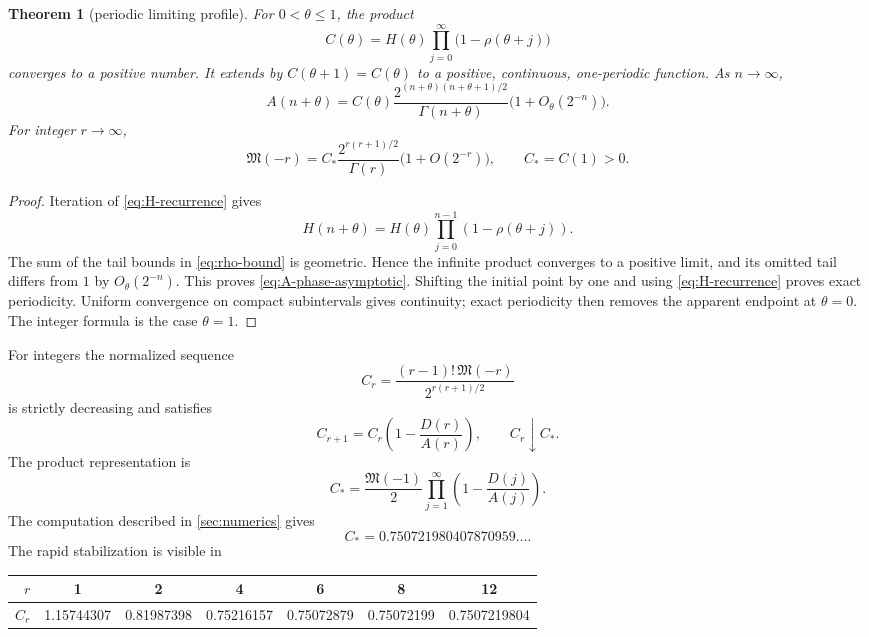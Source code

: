\documentclass[11pt,oneside]{article}
\newtheorem{theorem}{Theorem}[section]
\theoremstyle{definition}
\newcommand{\M}{\mathfrak M}
\begin{document}
\begin{theorem}[periodic limiting profile]\label{thm:phase-limit}
For \(0<\theta\le1\), the product
\begin{equation}\label{eq:Ctheta-product}
 C(\theta)=H(\theta)
 \prod_{j=0}^{\infty}\bigl(1-\rho(\theta+j)\bigr)
\end{equation}
converges to a positive number.  It extends by \(C(\theta+1)=C(\theta)\) to a
positive, continuous, one-periodic function.  As \(n\to\infty\),
\begin{equation}\label{eq:A-phase-asymptotic}
 A(n+\theta)=C(\theta)
 \frac{2^{(n+\theta)(n+\theta+1)/2}}{\Gamma(n+\theta)}
 \bigl(1+O_\theta(2^{-n})\bigr).
\end{equation}
For integer \(r\to\infty\),
\begin{equation}\label{eq:integer-negative-asymptotic}
 \boxed{\displaystyle
 \M(-r)=C_*\frac{2^{r(r+1)/2}}{\Gamma(r)}
 \bigl(1+O(2^{-r})\bigr),}
 \qquad C_*=C(1)>0.
\end{equation}
\end{theorem}

\begin{proof}
Iteration of \cref{eq:H-recurrence} gives
\[
 H(n+\theta)=H(\theta)
 \prod_{j=0}^{n-1}(1-\rho(\theta+j)).
\]
The sum of the tail bounds in \cref{eq:rho-bound} is geometric.  Hence the infinite
product converges to a positive limit, and its omitted tail differs from \(1\) by
\(O_\theta(2^{-n})\).  This proves \cref{eq:A-phase-asymptotic}.  Shifting the
initial point by one and using \cref{eq:H-recurrence} proves exact periodicity.
Uniform convergence on compact subintervals gives continuity; exact periodicity
then removes the apparent endpoint at \(\theta=0\).
The integer formula is the case \(\theta=1\).
\end{proof}

For integers the normalized sequence
\begin{equation}\label{eq:Cr-def}
 C_r=\frac{(r-1)!\,\M(-r)}{2^{r(r+1)/2}}
\end{equation}
is strictly decreasing and satisfies
\begin{equation}\label{eq:Cr-rec}
 C_{r+1}=C_r\left(1-\frac{D(r)}{A(r)}\right),
 \qquad C_r\downarrow C_*.
\end{equation}
The product representation is
\begin{equation}\label{eq:Cstar-product}
 C_*=\frac{\M(-1)}2
 \prod_{j=1}^{\infty}
 \left(1-\frac{D(j)}{A(j)}\right).
\end{equation}
The computation described in \cref{sec:numerics} gives
\begin{equation}\label{eq:Cstar-numeric}
 C_*=0.750721980407870959\ldots.
\end{equation}
The rapid stabilization is visible in
\begin{center}
\small
\begin{tabular}{@{}rcccccc@{}}
\toprule
\(r\)&1&2&4&6&8&12\\
\midrule
\(C_r\)&1.15744307&0.81987398&0.75216157&0.75072879&
0.75072199&0.7507219804\\
\bottomrule
\end{tabular}
\end{center}
\end{document}
